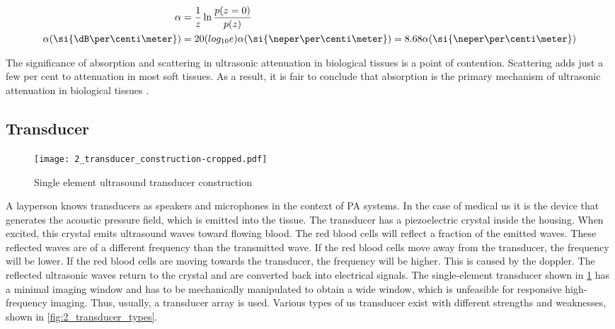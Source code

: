 \begin{subequations} \label{eq:2_attenuation_coefficient}
	\begin{align}
		\ensuremath{\alpha &= \frac{1}{z} \ln \frac{p(z=0)}{p(z)} \\
		\alpha( \si{\dB\per\centi\meter} ) &= 20 ( log_{10}e) \alpha ( \si{\neper\per\centi\meter}) = 8.68\alpha (\si{\neper\per\centi\meter})}
	\end{align}
\end{subequations}

The significance of absorption and scattering in ultrasonic attenuation in biological tissues is a point of contention. Scattering adds just a few per cent to attenuation in most soft tissues. As a result, it is fair to conclude that absorption is the primary mechanism of ultrasonic attenuation in biological tissues \cite{ShungUltrasound_Book}.

\subsection{Transducer}

\begin{figure}[htbp]
	\centering
	\texttt{[image: 2\_transducer\_construction-cropped.pdf]}
	\caption[Single element ultrasound transducer construction]{Single element ultrasound transducer construction \cite{JensenUltrasoundBook}}
	\label{fig:2_transducer_construction}
\end{figure}

A layperson knows transducers as speakers and microphones in the context of PA systems. In the case of medical \gls{us} it is the device that generates the acoustic pressure field, which is emitted into the tissue. The transducer has a piezoelectric crystal inside the housing. When excited, this crystal emits ultrasound waves toward flowing blood. The red blood cells will reflect a fraction of the emitted waves. These reflected waves are of a different frequency than the transmitted wave. If the red blood cells move away from the transducer, the frequency will be lower. If the red blood cells are moving towards the transducer, the frequency will be higher. This is caused by the \gls{doppler}. The reflected ultrasonic waves return to the crystal and are converted back into electrical signals. The single-element transducer shown in \cref{fig:2_transducer_construction} has a minimal imaging window and has to be mechanically manipulated to obtain a wide window, which is unfeasible for responsive high-frequency imaging. Thus, usually, a transducer array is used. Various types of \gls{us} transducer exist with different strengths and weaknesses, shown in \cref{fig:2_transducer_types}.

